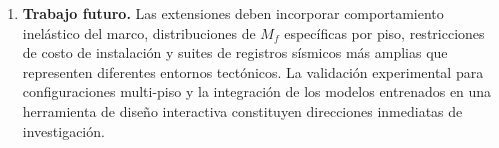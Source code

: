\documentclass[preprint,12pt,authoryear]{elsarticle}
\newcommand{\Mf}{M_{\!f}}
\begin{document}
\begin{enumerate}
\item \textbf{Trabajo futuro.}
Las extensiones deben incorporar comportamiento inelástico del marco,
distribuciones de $\Mf$ específicas por piso, restricciones de costo de
instalación y suites de registros sísmicos más amplias que representen diferentes
entornos tectónicos. La validación experimental para configuraciones multi-piso
y la integración de los modelos entrenados en una herramienta de diseño
interactiva constituyen direcciones inmediatas de investigación.

\end{enumerate}



\end{document}
